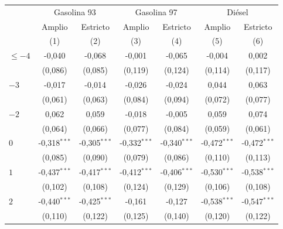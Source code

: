 \begingroup
\centering
\begin{tabular}{lcccccc}
   \toprule
    & \multicolumn{2}{c}{Gasolina 93} & \multicolumn{2}{c}{Gasolina 97} & \multicolumn{2}{c}{Diésel} \\ 
                          & Amplio         & Estricto       & Amplio         & Estricto       & Amplio         & Estricto \\   
                          & (1)            & (2)            & (3)            & (4)            & (5)            & (6)\\  
   \midrule 
   $\leq -4$              & -0{,}040         & -0{,}068         & -0{,}001         & -0{,}065         & -0{,}004         & 0{,}002\\   
                          & (0{,}086)        & (0{,}085)        & (0{,}119)        & (0{,}124)        & (0{,}114)        & (0{,}117)\\   
   $-3$                   & -0{,}017         & -0{,}014         & -0{,}026         & -0{,}024         & 0{,}044          & 0{,}063\\   
                          & (0{,}061)        & (0{,}063)        & (0{,}084)        & (0{,}094)        & (0{,}072)        & (0{,}077)\\   
   $-2$                   & 0{,}062          & 0{,}059          & -0{,}018         & -0{,}005         & 0{,}059          & 0{,}074\\   
                          & (0{,}064)        & (0{,}066)        & (0{,}077)        & (0{,}084)        & (0{,}059)        & (0{,}061)\\   
   $0$                    & -0{,}318$^{***}$ & -0{,}305$^{***}$ & -0{,}332$^{***}$ & -0{,}340$^{***}$ & -0{,}472$^{***}$ & -0{,}472$^{***}$\\   
                          & (0{,}085)        & (0{,}090)        & (0{,}079)        & (0{,}086)        & (0{,}110)        & (0{,}113)\\   
   $1$                    & -0{,}437$^{***}$ & -0{,}417$^{***}$ & -0{,}412$^{***}$ & -0{,}406$^{***}$ & -0{,}530$^{***}$ & -0{,}538$^{***}$\\   
                          & (0{,}102)        & (0{,}108)        & (0{,}124)        & (0{,}129)        & (0{,}106)        & (0{,}108)\\   
   $2$                    & -0{,}440$^{***}$ & -0{,}425$^{***}$ & -0{,}161         & -0{,}127         & -0{,}538$^{***}$ & -0{,}547$^{***}$\\   
                          & (0{,}110)        & (0{,}122)        & (0{,}125)        & (0{,}140)        & (0{,}120)        & (0{,}122)\\   

\end{tabular}
